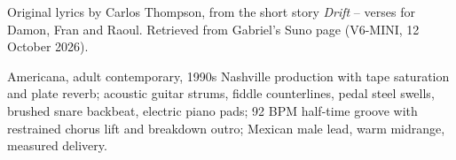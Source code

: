 
\label{sec:vamos-a-la-deriva}
\begin{notes}
Original lyrics by Carlos Thompson, from the short story \emph{Drift} -- verses for Damon, Fran and Raoul. Retrieved from Gabriel's Suno page (V6-MINI, 12 October 2026).
\end{notes}
\begin{style}
Americana, adult contemporary, 1990s Nashville production with tape saturation and plate reverb; acoustic guitar strums, fiddle counterlines, pedal steel swells, brushed snare backbeat, electric piano pads; 92 BPM half-time groove with restrained chorus lift and breakdown outro; Mexican male lead, warm midrange, measured delivery.
\end{style}
